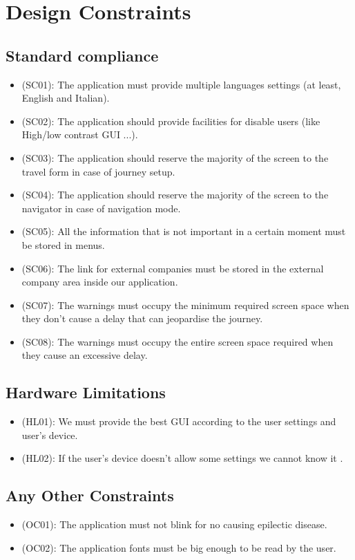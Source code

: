 \documentclass[a4paper,leqno]{book}
\begin{document}
\section{Design Constraints}
\subsection{Standard compliance}
\begin{itemize}
\item (SC01): The application must provide multiple languages settings (at least, English and Italian).
\item (SC02): The application should provide facilities for disable users (like High/low contrast GUI ...).
\item (SC03): The application should reserve the majority of the screen to the travel form in case of journey setup.
\item (SC04): The application should reserve the majority of the screen to the navigator in case of navigation mode.
\item (SC05): All the information that is not important in a certain moment must be stored in menus.
\item (SC06): The link for external companies must be stored in the external company area inside our application.
\item (SC07): The warnings must occupy the minimum required screen space  when they don't cause a delay that can jeopardise the journey.
\item (SC08): The warnings must occupy the entire screen space required when they cause an excessive delay.
\end{itemize}

\subsection{Hardware Limitations}
\begin{itemize}
\item (HL01): We must provide the best GUI according to the user settings and user's device.
\item (HL02): If the user's device doesn't allow some settings we cannot know it .
\end{itemize}

\subsection{Any Other Constraints}
\begin{itemize}
\item (OC01): The application must not blink for no causing epilectic disease.
\item (OC02): The application fonts must be big enough to be read by the user.
\end{itemize}
\end{document}

